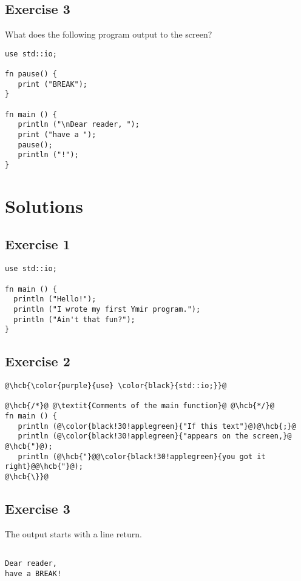 \subsection{Exercise 3}

What does the following program output to the screen?
\begin{lstlisting}[style=coloredverbatim]
use std::io;

fn pause() {
   print ("BREAK");
}

fn main () {
   println ("\nDear reader, ");
   print ("have a ");
   pause();
   println ("!");
}
\end{lstlisting}

\vfill%
\pagebreak
\section{Solutions}
\subsection{Exercise 1}

\begin{lstlisting}[style=coloredverbatim, caption=Solution for exercise 1]
use std::io;

fn main () {
  println ("Hello!");
  println ("I wrote my first Ymir program.");
  println ("Ain't that fun?");
}
\end{lstlisting}

\subsection{Exercise 2}

\begin{lstlisting}[style=coloredverbatimCorrect, escapechar=@]
@\hcb{\color{purple}{use} \color{black}{std::io;}}@

@\hcb{/*}@ @\textit{Comments of the main function}@ @\hcb{*/}@
fn main () {
   println (@\color{black!30!applegreen}{"If this text"}@)@\hcb{;}@
   println (@\color{black!30!applegreen}{"appears on the screen,}@ @\hcb{"}@);
   println (@\hcb{"}@@\color{black!30!applegreen}{you got it right}@@\hcb{"}@);
@\hcb{\}}@
\end{lstlisting}

\subsection{Exercise 3}
The output starts with a line return.
\begin{lstlisting}[style=bashVerb]

Dear reader,
have a BREAK!
\end{lstlisting}
